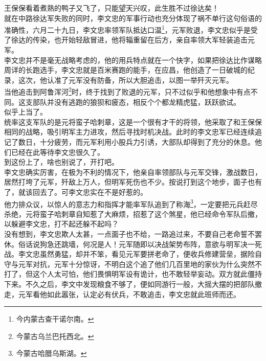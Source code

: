 \begin{multicols}{\theparacolNo}
王保保看着煮熟的鸭子又飞了，只能望天兴叹，此生胜不过徐达矣！\\

就在中路徐达军失败的同时，李文忠的军事行动也充分体现了祸不单行这句俗语的准确性，六月二十九日，李文忠率领军队抵达口温\footnote{今内蒙古查干诺尔南。}，元军败退，李文忠似乎是受了徐达的传染，也开始轻敌冒进，他将辎重留在后方，亲自率领大军轻装追击元军。\\

李文忠并不是毫无战略考虑的，他的用兵特点就在一个快字，如果把徐达比作谋略周详的长跑选手，李文忠就是百米赛跑的能手，在应昌，他创造了一日破城的纪录，这次，他认准了元军没有防备，所以大胆追击，以图一举歼灭元军。\\

当他追击到阿鲁浑河\footnote{今蒙古乌兰巴托西北。}时，终于找到了败退的元军，只不过似乎和他想象中有点不同。这支部队并没有逃跑的狼狈和疲态，相反个个都龙精虎猛，跃跃欲试。\\

似乎上当了。\\

统率这支军队的是元将蛮子哈刺章，这是一个很有才干的将领，他采取了和王保保相同的战略，吸引明军主力进攻，然后寻找时机决战。此时的李文忠军已经连续追记了数日，十分疲劳，而元军利用小股兵力引诱，大部队却得到了充分的休息。他们已经在此等待李文忠很久了。\\

到这份上了，啥也别说了，开打吧。\\

李文忠确实厉害，在极为不利的情况下，他亲自率领部队与元军交锋，激战数日，居然打垮了元军，歼敌上万人，但明军死伤也不少。按说打到这个地步，面子也有了，就该回去了。可李文忠实在不是好惹的。\\

他力排众议，以惊人的意志力和指挥才能率军队追到了称海\footnote{今蒙古哈腊乌斯湖。}，一定要把元兵赶尽杀绝，元将蛮子哈刺章自知惹了大麻烦，招惹了这个煞星，他已经命令军队后撤，以躲避李文忠，打不起还躲不起吗？\\

没有想到，李文忠欺人太甚，一点面子也不给，一路追过来，不要自己老命誓不罢休。俗话说狗急还跳墙，何况是人！元军随即以决战架势布阵，意欲与明军决一死战。李文忠虽然勇猛，却并不笨，看见元军要拼老命了，便收兵修建营垒，据险自守与元军对抗，元军十分惊讶，不明白这个追了他们几百里地的家伙为什么突然不打了，但这个人太可怕，他们畏惧明军设有诡计，也不敢轻举妄动。双方就此僵持下来。不久之后，李文中发现粮食不够了，便如同游行一般，大摇大摆的把部队撤走，元军看他如此嚣张，认定必有伏兵，不敢追击，李文忠就此班师而还。\\


\end{multicols}
